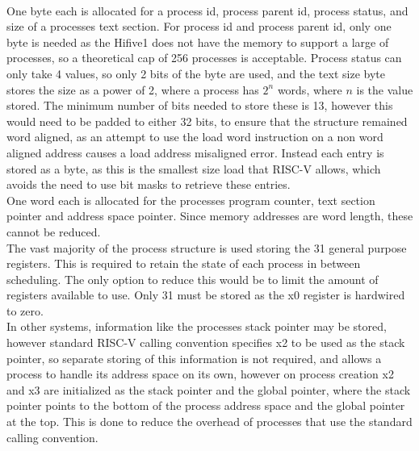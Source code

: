 \\
One byte each is allocated for a process id, process parent id, process status, and size of a processes text section. For process id and process parent id, only one byte is needed as the Hifive1 does not have the memory to support a large of processes, so a theoretical cap of 256 processes is acceptable. Process status can only take 4 values, so only 2 bits of the byte are used, and the text size byte stores the size as a power of 2, where a process has \(2^n\) words, where \(n\) is the value stored. The minimum number of bits needed to store these is 13, however this would need to be padded to either 32 bits, to ensure that the structure remained word aligned, as an attempt to use the load word instruction on a non word aligned address causes a load address misaligned error. Instead each entry is stored as a byte, as this is the smallest size load that RISC-V allows, which avoids the need to use bit masks to retrieve these entries.
\\
One word each is allocated for the processes program counter, text section pointer and address space pointer. Since memory addresses are word length, these cannot be reduced.
\\
The vast majority of the process structure is used storing the 31 general purpose registers. This is required to retain the state of each process in between scheduling. The only option to reduce this would be to limit the amount of registers available to use. Only 31 must be stored as the x0 register is hardwired to zero.
\\
In other systems, information like the processes stack pointer may be stored, however standard RISC-V calling convention specifies x2 to be used as the stack pointer, so separate storing of this information is not required, and allows a process to handle its address space on its own, however on process creation x2 and x3 are initialized as the stack pointer and the global pointer, where the stack pointer points to the bottom of the process address space and the global pointer at the top. This is done to reduce the overhead of processes that use the standard calling convention.
